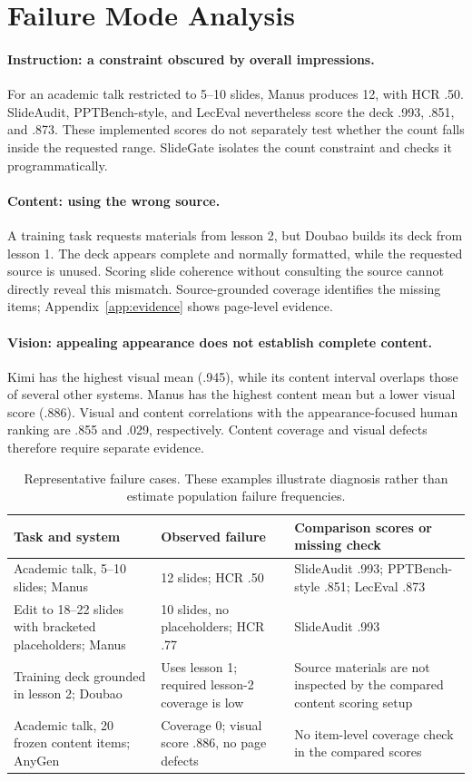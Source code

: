\section{Failure Mode Analysis}
\paragraph{Instruction: a constraint obscured by overall impressions.}
For an academic talk restricted to 5--10 slides, Manus produces 12, with HCR .50. SlideAudit, PPTBench-style, and LecEval nevertheless score the deck .993, .851, and .873. These implemented scores do not separately test whether the count falls inside the requested range. SlideGate isolates the count constraint and checks it programmatically.

\paragraph{Content: using the wrong source.}
A training task requests materials from lesson 2, but Doubao builds its deck from lesson 1. The deck appears complete and normally formatted, while the requested source is unused. Scoring slide coherence without consulting the source cannot directly reveal this mismatch. Source-grounded coverage identifies the missing items; Appendix~\ref{app:evidence} shows page-level evidence.

\paragraph{Vision: appealing appearance does not establish complete content.}
Kimi has the highest visual mean (.945), while its content interval overlaps those of several other systems. Manus has the highest content mean but a lower visual score (.886). Visual and content correlations with the appearance-focused human ranking are .855 and .029, respectively. Content coverage and visual defects therefore require separate evidence.

\begin{table}[t]
\caption{Representative failure cases. These examples illustrate diagnosis rather than estimate population failure frequencies.}
\label{tab:cases}\centering\small
\begin{tabularx}{\linewidth}{@{}YY Y@{}}
\toprule Task and system & Observed failure & Comparison scores or missing check\\\midrule
Academic talk, 5--10 slides; Manus & 12 slides; HCR .50 & SlideAudit .993; PPTBench-style .851; LecEval .873\\
Edit to 18--22 slides with bracketed placeholders; Manus & 10 slides, no placeholders; HCR .77 & SlideAudit .993\\
Training deck grounded in lesson 2; Doubao & Uses lesson 1; required lesson-2 coverage is low & Source materials are not inspected by the compared content scoring setup\\
Academic talk, 20 frozen content items; AnyGen & Coverage 0; visual score .886, no page defects & No item-level coverage check in the compared scores\\\bottomrule
\end{tabularx}
\end{table}

